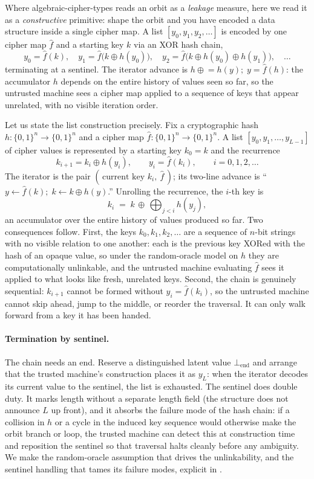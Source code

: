 \documentclass[11pt]{article}
\theoremstyle{definition}
\theoremstyle{plain}
\theoremstyle{definition}
\theoremstyle{remark}
\newcommand{\fhat}{\hat{f}}
\newcommand{\B}{\{0,1\}}
\begin{document}
Where algebraic-cipher-types reads an orbit as a \emph{leakage}
measure, here we read it as a \emph{constructive} primitive: shape the
orbit and you have encoded a data structure inside a single cipher
map. A list $[y_0, y_1, y_2, \ldots]$ is encoded by one cipher map
$\fhat$ and a starting key $k$ via an XOR hash chain,
\[
y_0 = \fhat(k), \quad
y_1 = \fhat\!\big(k \oplus h(y_0)\big), \quad
y_2 = \fhat\!\big(k \oplus h(y_0) \oplus h(y_1)\big), \quad \ldots
\]
terminating at a sentinel. The iterator advance is
$h \mathrel{\oplus}= h(y); \; y = \fhat(h)$: the accumulator $h$
depends on the entire history of values seen so far, so the untrusted
machine sees a cipher map applied to a sequence of keys that appear
unrelated, with no visible iteration order.

Let us state the list construction precisely. Fix a cryptographic hash
$h : \B^n \to \B^n$ and a cipher map $\fhat : \B^n \to \B^n$. A list
$[y_0, y_1, \ldots, y_{L-1}]$ of cipher values is represented by a
starting key $k_0 = k$ and the recurrence
\[
k_{i+1} = k_i \oplus h(y_i),
\qquad
y_i = \fhat(k_i),
\qquad i = 0, 1, 2, \ldots
\]
The iterator is the pair $(\,\text{current key } k_i,\ \fhat\,)$; its
two-line advance is \enquote{$y \leftarrow \fhat(k);\; k \leftarrow k
\oplus h(y)$.} Unrolling the recurrence, the $i$-th key is
\[
k_i \;=\; k \,\oplus\, \bigoplus_{j<i} h(y_j),
\]
an accumulator over the entire history of values produced so far. Two
consequences follow. First, the keys $k_0, k_1, k_2, \ldots$ are a
sequence of $n$-bit strings with no visible relation to one another:
each is the previous key XORed with the hash of an opaque value, so
under the random-oracle model on $h$ they are computationally
unlinkable, and the untrusted machine evaluating $\fhat$ sees it
applied to what looks like fresh, unrelated keys. Second, the chain is
genuinely sequential: $k_{i+1}$ cannot be formed without $y_i =
\fhat(k_i)$, so the untrusted machine cannot skip ahead, jump to the
middle, or reorder the traversal. It can only walk forward from a key
it has been handed.

\paragraph{Termination by sentinel.} The chain needs an end. Reserve a
distinguished latent value $\bot_{\mathrm{end}}$ and arrange that the
trusted machine's construction places it as $y_{L}$: when the iterator
decodes its current value to the sentinel, the list is exhausted. The
sentinel does double duty. It marks length without a separate length
field (the structure does not announce $L$ up front), and it absorbs
the failure mode of the hash chain: if a collision in $h$ or a cycle
in the induced key sequence would otherwise make the orbit branch or
loop, the trusted machine can detect this at construction time and
reposition the sentinel so that traversal halts cleanly before any
ambiguity. We make the random-oracle assumption that drives the
unlinkability, and the sentinel handling that tames its failure modes,
explicit in .
\end{document}
